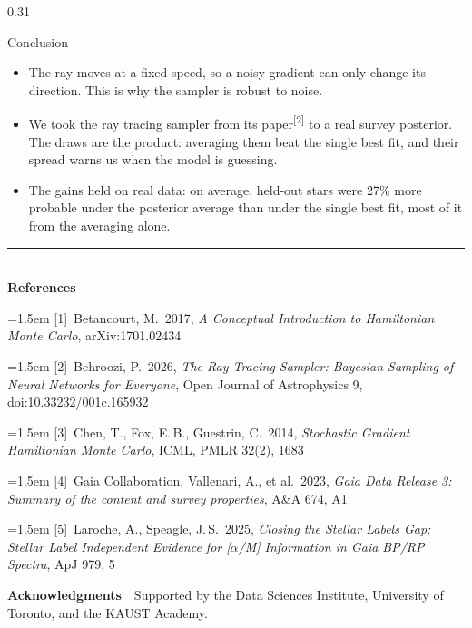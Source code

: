 \documentclass[final]{beamer}
\newcommand{\refmark}[1]{\textsuperscript{\textcolor{uoftblue}{[#1]}}}
\newcommand{\refitem}[2]{\noindent\hangindent=1.5em\hangafter=1 [#1]~#2\par}
\begin{document}
\begin{frame}[t]
\begin{columns}[t]
\begin{column}{0.31\paperwidth}
\begin{block}{Conclusion}
\begin{itemize}\setlength{\itemsep}{0.02cm}
  \item The ray moves at a fixed speed, so a noisy gradient can only
    change its direction. This is why the sampler is robust to noise.
  \item We took the ray tracing sampler from its paper\refmark{2} to a
    real survey posterior. The draws are the product: averaging them beat
    the single best fit, and their spread warns us when the model is
    guessing.
  \item The gains held on real data: on average, held-out stars were
    27\% more probable under the posterior average than under the single
    best fit, most of it from the averaging alone.
\end{itemize}
\end{block}

{\footnotesize\setlength{\parskip}{0.20\baselineskip}
\noindent\textcolor{uoftblue}{\rule{\linewidth}{0.7mm}}\\[0.35ex]
\textbf{References}\par
\refitem{1}{Betancourt, M.\ 2017, \emph{A Conceptual Introduction to Hamiltonian Monte Carlo}, arXiv:1701.02434}
\refitem{2}{Behroozi, P.\ 2026, \emph{The Ray Tracing Sampler: Bayesian Sampling of Neural Networks for Everyone}, Open Journal of Astrophysics 9, doi:10.33232/001c.165932}
\refitem{3}{Chen, T., Fox, E.\,B., Guestrin, C.\ 2014, \emph{Stochastic Gradient Hamiltonian Monte Carlo}, ICML, PMLR 32(2), 1683}
\refitem{4}{Gaia Collaboration, Vallenari, A., et al.\ 2023, \emph{Gaia Data Release 3: Summary of the content and survey properties}, A\&A 674, A1}
\refitem{5}{Laroche, A., Speagle, J.\,S.\ 2025, \emph{Closing the Stellar Labels Gap: Stellar Label Independent Evidence for [\(\alpha\)/M] Information in Gaia BP/RP Spectra}, ApJ 979, 5}
\vspace{0.30cm}

\noindent\textbf{Acknowledgments}\ \ Supported by the Data Sciences Institute,
University of Toronto, and the KAUST Academy.
}

\end{column}

\end{columns}

\end{frame}
\end{document}
